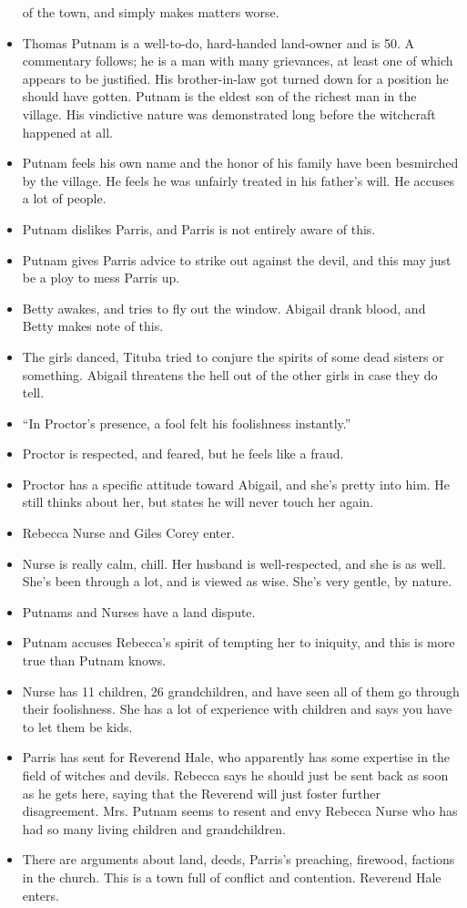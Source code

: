 \documentclass[10pt]{article}
\begin{document}
\begin{itemize}
		of the town, and simply makes matters worse.
	\item Thomas Putnam is a well-to-do, hard-handed land-owner and is
		50.  A commentary follows; he is a man with many grievances, at 
		least one of which appears to be justified.  His brother-in-law
		got turned down for a position he should have gotten.  Putnam is
		the eldest son of the richest man in the village.  His vindictive 
		nature was demonstrated long before the witchcraft happened at all.
	\item Putnam feels his own name and the honor of his family have been 
		besmirched by the village.  He feels he was unfairly treated in his
		father's will.  He accuses a lot of people.
	\item Putnam dislikes Parris, and Parris is not entirely aware of this.
	\item Putnam gives Parris advice to strike out against the devil,
		and this may just be a ploy to mess Parris up.
	\item Betty awakes, and tries to fly out the window.  Abigail drank
		blood, and Betty makes note of this.
	\item The girls danced, Tituba tried to conjure the spirits of 
		some dead sisters or something.  Abigail threatens the hell out of
		the other girls in case they do tell.
	\item ``In Proctor's presence, a fool felt his foolishness instantly.''
	\item Proctor is respected, and feared, but he feels like a fraud.
	\item Proctor has a specific attitude toward Abigail, and she's 
		pretty into him.  He still thinks about her, but states he will
		never touch her again.
	\item Rebecca Nurse and Giles Corey enter.
	\item Nurse is really calm, chill.  Her husband is well-respected,
		and she is as well.  She's been through a lot, and is viewed as
		wise.  She's very gentle, by nature.
	\item Putnams and Nurses have a land dispute.
	\item Putnam accuses Rebecca's spirit of tempting her to iniquity,
		and this is more true than Putnam knows.
	\item Nurse has 11 children, 26 grandchildren, and have seen all
		of them go through their foolishness.  She has a lot of experience
		with children and says you have to let them be kids.
	\item Parris has sent for Reverend Hale, who apparently has some
		expertise in the field of witches and devils.  Rebecca says he
		should just be sent back as soon as he gets here, saying that the
		Reverend will just foster further disagreement.  Mrs. Putnam seems
		to resent and envy Rebecca Nurse who has had so many living children
		and grandchildren.
	\item There are arguments about land, deeds, Parris's preaching,
		firewood, factions in the church.  This is a town full of conflict
		and contention.  Reverend Hale enters.
\end{itemize}
\end{document}

